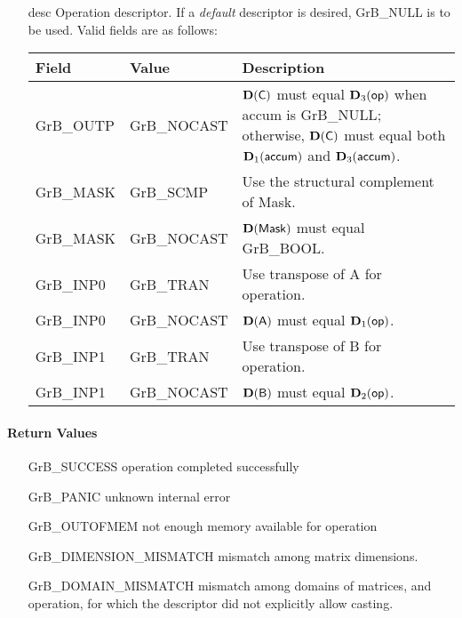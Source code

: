 \begin{itemize}[leftmargin=1.1in]
    \item[{\sf desc}]  Operation descriptor. If a
    \emph{default} descriptor is desired, {\sf GrB\_NULL} is to be
    used. Valid fields are as follows: \\
    \begin{tabular}{llp{3in}}
        Field  & Value & Description \\
        \hline
        {\sf GrB\_OUTP} & {\sf GrB\_NOCAST} & $\bold{D}({\sf C})$ must equal $\bold{D}_3({\sf op})$
                                              when {\sf accum} is {\sf GrB\_NULL}; otherwise, 
                                              $\bold{D}({\sf C})$ must equal both 
                                              $\bold{D}_1({\sf accum})$ and $\bold{D}_3({\sf accum})$. \\
        {\sf GrB\_MASK} & {\sf GrB\_SCMP}   & Use the structural complement of {\sf Mask}. \\
        {\sf GrB\_MASK} & {\sf GrB\_NOCAST} & $\bold{D}({\sf Mask})$ must equal {\sf GrB\_BOOL}. \\
        {\sf GrB\_INP0} & {\sf GrB\_TRAN}   & Use transpose of {\sf A} for operation. \\
        {\sf GrB\_INP0} & {\sf GrB\_NOCAST} & $\bold{D}({\sf A})$ must equal $\bold{D}_1({\sf op})$. \\
        {\sf GrB\_INP1} & {\sf GrB\_TRAN}   & Use transpose of {\sf B} for operation. \\
        {\sf GrB\_INP1} & {\sf GrB\_NOCAST} & $\bold{D}({\sf B})$ must equal $\bold{D}_2({\sf op})$. \\
    \end{tabular}
\end{itemize}

\paragraph{Return Values}

\begin{itemize}[leftmargin=2.1in]
    \item[{\sf GrB\_SUCCESS}]             operation completed successfully
    \item[{\sf GrB\_PANIC}]               unknown internal error
    \item[{\sf GrB\_OUTOFMEM}]            not enough memory available for operation
    \item[{\sf GrB\_DIMENSION\_MISMATCH}] mismatch among matrix dimensions.
    \item[{\sf GrB\_DOMAIN\_MISMATCH}]    mismatch among domains of matrices, and operation, for which the descriptor did not explicitly allow casting.
\end{itemize}

